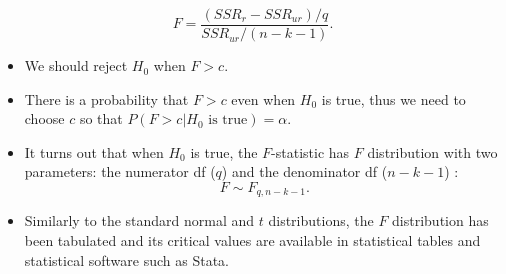 \documentclass[notes=show,compress,beamer]{beamer}
\begin{document}
\begin{frame}%


\begin{equation*}
F=\frac{\left( SSR_{r}-SSR_{ur}\right) /q}{SSR_{ur}/\left( n-k-1\right) }.
\end{equation*}%
\pause%

\begin{itemize}
\item We should reject $H_{0}$ when $F>c.$%
\pause%

\item There is a probability that $F>c$ even when $H_{0}$ is true, thus we
need to choose $c$ so that $P\left( F>c|H_{0}\text{ is true}\right) =\alpha
. $%
\pause%

\item It turns out that when $H_{0}$ is true, the $F$-statistic has $F$
distribution with two parameters: the numerator df ($q$) and the denominator
df ($n-k-1$)%
\pause%
:%
\begin{equation*}
F\sim F_{q,n-k-1}.
\end{equation*}%
\pause%

\item Similarly to the standard normal and $t$ distributions, the $F$
distribution has been tabulated and its critical values are available in
statistical tables and statistical software such as Stata.
\end{itemize}

\end{frame}%
\end{document}
